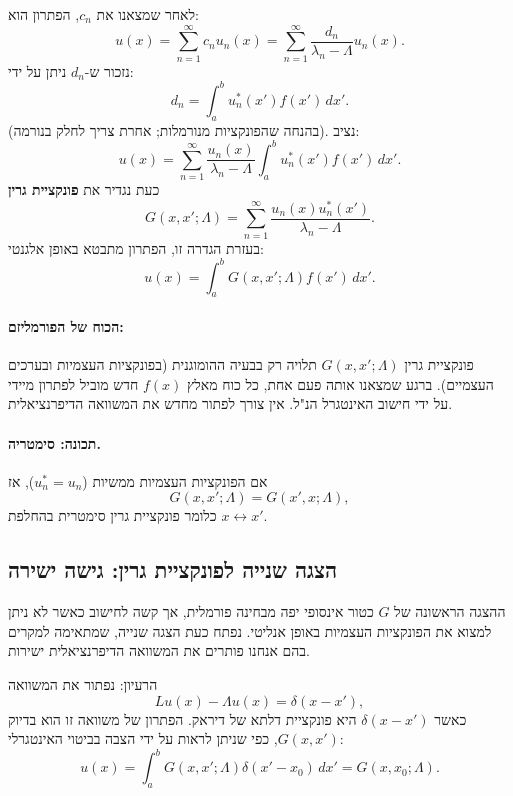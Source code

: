 לאחר שמצאנו את \(c_n\), הפתרון הוא:
\[
u(x) = \sum_{n=1}^\infty c_n u_n(x) = \sum_{n=1}^\infty \frac{d_n}{\lambda_n - \Lambda} u_n(x).
\]
נזכור ש-\(d_n\) ניתן על ידי:
\[
d_n = \int_a^b u_n^*(x') f(x') \, dx'.
\]
(בהנחה שהפונקציות מנורמלות; אחרת צריך לחלק בנורמה). נציב:
\[
u(x) = \sum_{n=1}^\infty \frac{u_n(x)}{\lambda_n - \Lambda} \int_a^b u_n^*(x') f(x') \, dx'.
\]
כעת נגדיר את \textbf{פונקציית גרין} 
\[
G(x, x'; \Lambda) = \sum_{n=1}^\infty \frac{u_n(x) u_n^*(x')}{\lambda_n - \Lambda}.
\]
בעזרת הגדרה זו, הפתרון מתבטא באופן אלגנטי:
\[
u(x) = \int_a^b G(x, x'; \Lambda) f(x') \, dx'.
\]

\paragraph{הכוח של הפורמליזם:}
פונקציית גרין \(G(x, x'; \Lambda)\) תלויה רק בבעיה ההומוגנית (בפונקציות העצמיות ובערכים העצמיים). ברגע שמצאנו אותה פעם אחת, כל כוח מאלץ \(f(x)\) חדש מוביל לפתרון מיידי על ידי חישוב האינטגרל הנ"ל. אין צורך לפתור מחדש את המשוואה הדיפרנציאלית.

\paragraph{תכונה: סימטריה.}
אם הפונקציות העצמיות ממשיות (\(u_n^* = u_n\)), אז
\[
G(x, x'; \Lambda) = G(x', x; \Lambda),
\]
כלומר פונקציית גרין סימטרית בהחלפת \(x \leftrightarrow x'\).

\subsection*{הצגה שנייה לפונקציית גרין: גישה ישירה}

ההצגה הראשונה של \(G\) כטור אינסופי יפה מבחינה פורמלית, אך קשה לחישוב כאשר לא ניתן למצוא את הפונקציות העצמיות באופן אנליטי. נפתח כעת הצגה שנייה, שמתאימה למקרים בהם אנחנו פותרים את המשוואה הדיפרנציאלית ישירות.

הרעיון: נפתור את המשוואה
\[
L u(x) - \Lambda u(x) = \delta(x - x'),
\]
כאשר \(\delta(x - x')\) היא פונקציית דלתא של דיראק. הפתרון של משוואה זו הוא בדיוק \(G(x, x')\), כפי שניתן לראות על ידי הצבה בביטוי האינטגרלי:
\[
u(x) = \int_a^b G(x, x'; \Lambda) \delta(x' - x_0) \, dx' = G(x, x_0; \Lambda).
\]

